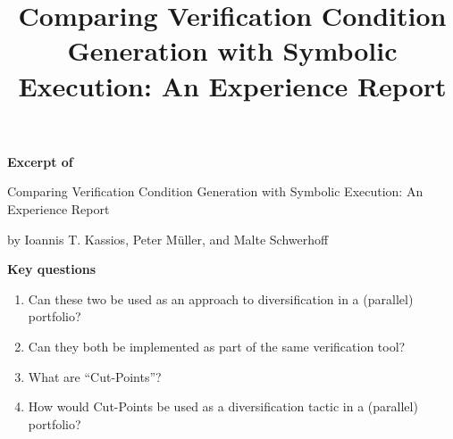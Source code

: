 \documentclass{scrartcl}
\title{Comparing Verification Condition Generation with Symbolic Execution: An Experience Report}
\begin{document}
\begin{center}
    \Large{\textbf{Excerpt of}}

    \LARGE{Comparing Verification Condition Generation
    with Symbolic Execution: An Experience Report}

    \large{by Ioannis T. Kassios, Peter Müller, and Malte Schwerhoff}
\end{center}

\vspace{1cm}

\begin{addmargin}[0.2\linewidth]{0.2\linewidth}
    \begin{center}
        \textbf{Key questions}
    \end{center}
    \begin{enumerate}[i]
        \item Can these two be used as an approach to diversification in a (parallel) portfolio?
        \item Can they both be implemented as part of the same verification tool?
        \item What are \enquote{Cut-Points}?
        \item How would Cut-Points be used as a diversification tactic in a (parallel) portfolio?
    \end{enumerate}
\end{addmargin}

\vspace{1cm}
\end{document}
